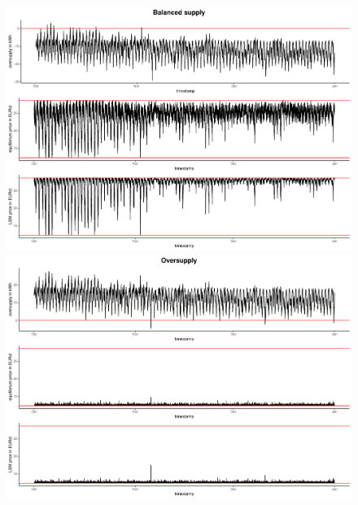 \begin{figure}[H]
    \centering
    \includegraphics[width=\textwidth-.85cm]{thesis/graphs/marketsimulation/marketoutcome_pred_balanced.pdf}\\\vspace{.6cm}
    \includegraphics[width=\textwidth-.85cm]{thesis/graphs/marketsimulation/marketoutcome_pred_oversupply.pdf}
\end{figure}
    
